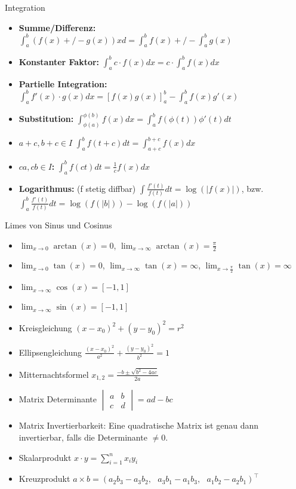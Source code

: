 \begin{Rechenregeln}{Integration}{}
    \begin{itemize}
    \item \textbf{Summe/Differenz:} $\int_a^b (f(x) +/- g(x)) xd = \int_a^b f(x) +/- \int_a^b g(x)$
    \item \textbf{Konstanter Faktor:} $\int_a^b c\cdot f(x)dx = c\cdot \int_a^b f(x)dx$
    \item \textbf{Partielle Integration:} $\int_a^b f'(x)\cdot g(x)dx = \left[f(x)g(x)\right]_a^b - \int_a^b f(x)g'(x)$
    \item \textbf{Substitution:} $\int_{\phi(a)}^{\phi(b)} f(x)dx = \int_a^b f(\phi(t))\phi '(t) dt$
    \item \textbf{$a+c, b+c \in I$} $\int_a^b f(t+c)dt = \int_{a+c}^{b+c} f(x)dx$
    \item \textbf{$ca,cb\in I$: } $\int_a^b f(ct)dt = \frac{1}{c}f(x)dx$
    \item \textbf{Logarithmus: }\;(f stetig diffbar) $\int\frac{f'(t)}{f(t)}dt = \log(|f(x)|)$, bzw. $\int_a^b\frac{f'(t)}{f(t)}dt = \log(f(|b|)) - \log(f(|a|))$
    \end{itemize}
\end{Rechenregeln}

\begin{Rechenregeln}{Limes von Sinus und Cosinus}{}
    \begin{itemize}
    \item $\lim_{x\to 0} \arctan(x) = 0$, $\lim_{x\to\infty} \arctan(x) = \frac{\pi}{2}$
    \item $\lim_{x\to 0} \tan(x) = 0$, $\lim_{x\to\infty} \tan(x) = \infty$, $\lim_{x\to\frac{\pi}{2}} \tan(x) = \infty$
    \item $\lim_{x\to\infty} \cos(x) = [-1, 1]$
    \item $\lim_{x\to\infty} \sin(x) = [-1, 1]$
    \end{itemize}
\end{Rechenregeln}

\begin{Diverses}{}{}
    \begin{itemize}
    \item Kreisgleichung $(x - x_0)^2 + (y - y_0)^2 = r^2$
    \item Ellipsengleichung $\frac{(x-x_0)^2}{a^2} + \frac{(y-y_0)^2}{b^2} = 1$
    \item Mitternachtsformel $x_{1, 2} = \frac{-b \pm \sqrt{b^2 - 4ac}}{2a}$
    \item Matrix Determinante $\begin{vmatrix}
        a & b\\
        c & d
    \end{vmatrix} = ad-bc$
    \item Matrix Invertierbarkeit: Eine quadratische Matrix ist genau dann invertierbar, falls die Determinante $\neq 0$.
    \item Skalarprodukt $x \cdot y = \sum_{i=1}^n x_i y_i$
    \item Kreuzprodukt $a \times b = (a_2b_3-a_3b_2, ~~~ a_3b_1-a_1b_3, ~~~ a_1b_2-a_2b_1)^\top$
    \end{itemize}
\end{Diverses}

